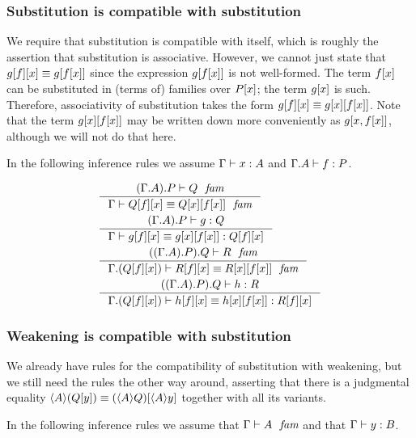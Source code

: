 \subsubsection{Substitution is compatible with substitution}\label{comp-ss}

We require that substitution is compatible with itself, which is roughly the
assertion that substitution is associative. However, we cannot just state that
$\subst{x}{{f}{g}}\jdeq\subst{{x}{f}}{g}$ since the expression $\subst{{x}{f}}{g}$
is not well-formed. The term $\subst{x}{f}$ can be substituted in (terms of) families over
$\subst{x}{P}$; the term $\subst{x}{g}$ is such. Therefore, associativity of
substitution takes the form $\subst{x}{{f}{g}}\jdeq\subst{{x}{f}}{{x}{g}}$.
Note that the term $\subst{{x}{f}}{{x}{g}}$ may be written down more conveniently
as $\subst{x,\subst{x}{f}}{g}$, although we will not do that here.

In the following inference rules we assume
$\jterm{\Gamma}{A}{x}$ and $\jterm{\ctxext{\Gamma}{A}}{P}{f}$.

\begin{align}
&\inference{\jfam{\ctxext{{\Gamma}{A}}{P}}{Q}}
{\jfameq{\Gamma}{\subst{x}{{f}{Q}}}{\subst{{x}{f}}{{x}{Q}}}}\label{comp-ss-1}\\
&\inference{\jterm{\ctxext{{\Gamma}{A}}{P}}{Q}{g}}
{\jtermeq{\Gamma}{\subst{x}{{f}{Q}}}{\subst{x}{{f}{g}}}{\subst{{x}{f}}{{x}{g}}}}\label{comp-ss-2}\\
&\inference{\jfam{\ctxext{{{\Gamma}{A}}{P}}{Q}}{R}}
{\jfameq{\ctxext{\Gamma}{\subst{x}{{f}{Q}}}}{\subst{x}{{f}{R}}}{\subst{{x}{f}}{{x}{R}}}}\label{comp-ss-3}\\
&\inference{\jterm{\ctxext{{{\Gamma}{A}}{P}}{Q}}{R}{h}}
{\jtermeq{\ctxext{\Gamma}{\subst{x}{{f}{Q}}}}{\subst{x}{{f}{R}}}{\subst{x}{{f}{h}}}{\subst{{x}{f}}{{x}{h}}}}\label{comp-ss-4}
\end{align}

\subsubsection{Weakening is compatible with substitution}\label{comp-ws}
We already have rules for the compatibility of substitution with weakening, but
we still need the rules the other way around, asserting that there is a 
judgmental equality $\ctxwk{A}{\subst{y}{Q}}\jdeq\subst{\ctxwk{A}{y}}{\ctxwk{A}{Q}}$
together with all its variants.

In the following inference rules we assume that $\jfam{\Gamma}{A}$ and that
$\jterm{\Gamma}{B}{y}$.

